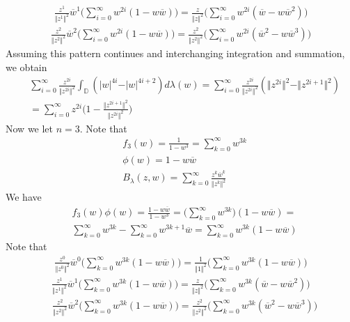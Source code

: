 \documentclass[12pt]{article}
\begin{document}
\begin{align*}
\frac{z^1}{\Vert z^1 \Vert^2} \overline{w}^1 \bigg(\sum_{i=0}^\infty w^{2i}(1-w\overline{w})\bigg) = \frac{z}{\Vert z \Vert^2} \bigg(\sum_{i=0}^\infty w^{2i}(\overline{w}-w\overline{w}^2)\bigg)
\end{align*}
\begin{align*}
\frac{z^2}{\Vert z^2 \Vert^2} \overline{w}^2 \Bigg(\sum_{i=0}^\infty w^{2i}(1-w\overline{w})\Bigg) = \frac{z^2}{\Vert z^2 \Vert^2}  \Bigg(\sum_{i=0}^\infty w^{2i}(\overline{w}^2-w\overline{w}^3)\Bigg)
\end{align*} Assuming this pattern continues and interchanging integration and summation, we obtain
\begin{align*}
&\sum_{i=0}^\infty \frac{z^{2i}}{\Vert z^{2i} \Vert^2} \int_\mathbb{\mathbb{D}} (\vert w \vert^{4i} - \vert w \vert^{4i + 2}) d\lambda(w) = \sum_{i=0}^\infty \frac{z^{2i}}{\Vert z^{2i} \Vert^2}(\Vert z^{2i} \Vert^2 -  \Vert z^{2i+1} \Vert^2)\\
&  = \sum_{i=0}^\infty z^{2i} \bigg(1 - \frac{\Vert z^{2i+1}\Vert^2}{\Vert z^{2i}\Vert^2}\bigg)
\end{align*} Now we let $n = 3$. Note that
\begin{align*}
&f_3(w) = \frac{1}{1-w^3} = \sum_{k=0}^\infty w^{3k} \\
&\phi(w) = 1 - w \overline{w}\\
&B_\lambda(z,w) = \sum_{k=0}^\infty \frac{z^k \overline{w}^k}{\Vert z^k \Vert^2} 
\end{align*} We have
\begin{align*}
&f_3(w) \phi(w) = \frac{1-w\overline{w}}{1-w^3} = \Bigg(\sum_{k=0}^\infty w^{3k}\Bigg)(1 - w\overline{w}) = \\
& \sum_{k=0}^\infty w^{3k} - \sum_{k=0}^\infty w^{3k+1}\overline{w} = \sum_{k=0}^\infty w^{3k}(1 - w\overline{w})
\end{align*} Note that
\begin{align*}
\frac{z^0}{\Vert z^0 \Vert^2} \overline{w}^0 \Bigg(\sum_{k=0}^\infty w^{3k}(1 - w\overline{w})\Bigg) =\frac{1}{\Vert 1 \Vert^2} \Bigg(\sum_{k=0}^\infty w^{3k}(1 - w\overline{w})\Bigg)
\end{align*}
\begin{align*}
\frac{z^1}{\Vert z^1 \Vert^2} \overline{w}^1 \Bigg(\sum_{k=0}^\infty w^{3k}(1 - w\overline{w})\Bigg) = \frac{z}{\Vert z \Vert^2}\Bigg(\sum_{k=0}^\infty w^{3k}(\overline{w} - w\overline{w}^2)\Bigg)
\end{align*}
\begin{align*}
&\frac{z^2}{\Vert z^2 \Vert^2} \overline{w}^2 \Bigg(\sum_{k=0}^\infty w^{3k}(1 - w\overline{w})\Bigg)= \frac{z^2}{\Vert z^2 \Vert^2} \Bigg(\sum_{k=0}^\infty w^{3k}(\overline{w}^2 - w\overline{w}^3)\Bigg)
\end{align*}
\end{document}
